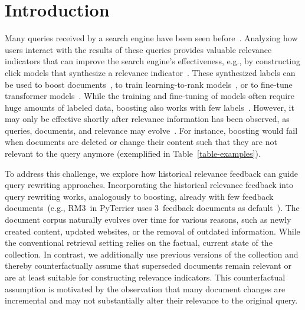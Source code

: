 \section{Introduction}

Many queries received by a search engine have been seen before~\cite{DBLP:journals/sigir/SilversteinHMM99}. Analyzing how users interact with the results of these queries provides valuable relevance indicators that can improve the search engine's effectiveness, e.g., by constructing click models that synthesize a relevance indicator~\cite{chuklin:2015}. These synthesized labels can be used to boost documents~\cite{keller:2024b}, to train learning-to-rank models~\cite{liu:2011}, or to fine-tune transformer models~\cite{lin:2021}. While the training and fine-tuning of models often require huge amounts of labeled data, boosting also works with few labels~\cite{keller:2024b}. However, it may only be effective shortly after relevance information has been observed, as queries, documents, and relevance may evolve~\cite{keller:2024}. For instance, boosting would fail when documents are deleted or change their content such that they are not relevant to the query anymore (exemplified in Table~\ref{table-examples}).





To address this challenge, we explore how historical relevance feedback can guide query rewriting approaches. Incorporating the historical relevance feedback into query rewriting works, analogously to boosting, already with few feedback documents~(e.g., RM3~in PyTerrier uses 3~feedback documents as default~\cite{macdonald:2020}). The document corpus naturally evolves over time for various reasons, such as newly created content, updated websites, or the removal of outdated information. While the conventional retrieval setting relies on the factual, current state of the collection. In contrast, we additionally use previous versions of the collection and thereby counterfactually assume that superseded documents remain relevant or are at least suitable for constructing relevance indicators. This counterfactual assumption is motivated by the observation that many document changes are incremental and may not substantially alter their relevance to the original query.


